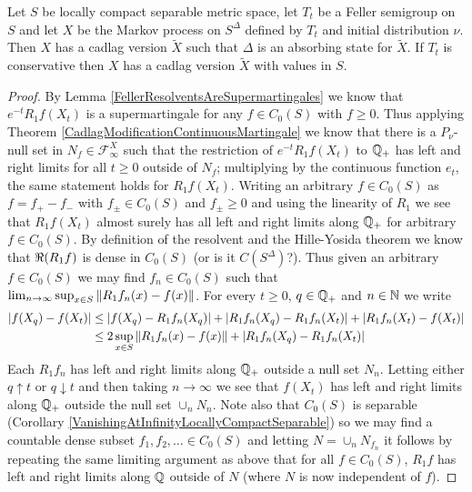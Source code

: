 \begin{thm}\label{CadlagModificationFellerProcess}Let $S$ be locally compact separable metric space, let $T_t$ be a Feller semigroup on $S$ and let $X$ be the Markov process 
on $S^\Delta$ defined by $T_t$ and initial distribution $\nu$.  Then $X$ has a cadlag version $\tilde{X}$ such that $\Delta$ is an absorbing state for $\tilde{X}$.  If $T_t$ is conservative then $X$ has a cadlag version $\tilde{X}$ with values in $S$.
\end{thm}
\begin{proof}
By Lemma \ref{FellerResolventsAreSupermartingales} we know that $e^{-t} R_1 f(X_t)$ is a supermartingale for any $f \in C_0(S)$ with $f \geq 0$.  Thus applying Theorem \ref{CadlagModificationContinuousMartingale} we know that there is a $P_\nu$-null set in $N_f \in \mathcal{F}^X_\infty$ such that the restriction of $e^{-t} R_1 f(X_t)$ to $\mathbb{Q}_+$ has left and right limits for all $t \geq 0$ outside of $N_f$; multiplying by the continuous function $e_t$, the same statement holds for $R_1 f(X_t)$.  Writing an arbitrary $f \in C_0(S)$ as $f = f_+ - f_-$ with $f_\pm \in C_0(S)$ and $f_\pm \geq 0$ and using the linearity of $R_1$ we see that $R_1 f(X_t)$ almost surely has all left and right limits along $\mathbb{Q}_+$ for arbitrary $f \in C_0(S)$.  By definition of the resolvent and the Hille-Yosida theorem we know that $\Re(R_1 f)$ is dense in $C_0(S)$ (or is it $C(S^\Delta)$?).
Thus given an arbitrary $f \in C_0(S)$ we may find $f_n \in C_0(S)$ such that $\lim_{n \to \infty} \sup_{x \in S} \left \lVert R_1 f_n(x) - f(x) \right \rVert$.  For every $t \geq 0$, $q \in \mathbb{Q}_+$ and $n \in \mathbb{N}$ we write
\begin{align*}
\left \vert f(X_q) - f(X_t) \right \vert &\leq \left \vert f(X_q) - R_1f_n(X_q) \right \vert + \left \vert R_1f_n(X_q) - R_1f_n(X_t) \right \vert + \left \vert R_1 f_n(X_t) - f(X_t) \right \vert \\
&\leq 2 \sup_{x \in S} \left \lVert R_1 f_n(x) - f(x) \right \rVert + \left \vert R_1f_n(X_q) - R_1f_n(X_t) \right \vert
\end{align*}
Each $R_1 f_n$ has left and right limits along $\mathbb{Q}_+$ outside a null set $N_{n}$.  Letting either $q \uparrow t$ or $q \downarrow t$ and then taking $n \to \infty$ we see that $f(X_t)$ has left and right limits along $\mathbb{Q}_+$ outside the null set $\cup_n N_n$.  Note also that $C_0(S)$ is separable (Corollary \ref{VanishingAtInfinityLocallyCompactSeparable}) so we may find a countable dense subset $f_1, f_2,\dotsc \in C_0(S)$ and letting $N = \cup_n N_{f_n}$ it follows by repeating the same limiting argument as above that for all $f \in C_0(S)$, $R_1 f$ has left and right limits along $\mathbb{Q}$ outside of $N$ (where $N$ is now independent of $f$). 


\end{proof}
